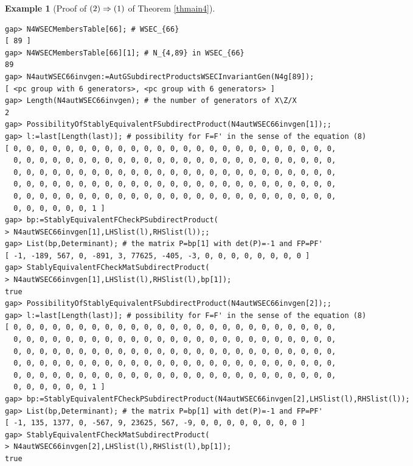 \documentclass{amsart}
\theoremstyle{plain}
\theoremstyle{definition}
\newtheorem{example}[theorem]{Example}
\theoremstyle{remark}
\begin{document}
\begin{example}[Proof of ${\rm (2)}\Rightarrow {\rm (1)}$ of {Theorem \ref{thmain4}}]
\begin{verbatim}
gap> N4WSECMembersTable[66]; # WSEC_{66}
[ 89 ]
gap> N4WSECMembersTable[66][1]; # N_{4,89} in WSEC_{66}
89
gap> N4autWSEC66invgen:=AutGSubdirectProductsWSECInvariantGen(N4g[89]);
[ <pc group with 6 generators>, <pc group with 6 generators> ]
gap> Length(N4autWSEC66invgen); # the number of generators of X\Z/X
2
gap> PossibilityOfStablyEquivalentFSubdirectProduct(N4autWSEC66invgen[1]);;
gap> l:=last[Length(last)]; # possibility for F=F' in the sense of the equation (8)
[ 0, 0, 0, 0, 0, 0, 0, 0, 0, 0, 0, 0, 0, 0, 0, 0, 0, 0, 0, 0, 0, 0, 0, 0, 0, 
  0, 0, 0, 0, 0, 0, 0, 0, 0, 0, 0, 0, 0, 0, 0, 0, 0, 0, 0, 0, 0, 0, 0, 0, 0, 
  0, 0, 0, 0, 0, 0, 0, 0, 0, 0, 0, 0, 0, 0, 0, 0, 0, 0, 0, 0, 0, 0, 0, 0, 0, 
  0, 0, 0, 0, 0, 0, 0, 0, 0, 0, 0, 0, 0, 0, 0, 0, 0, 0, 0, 0, 0, 0, 0, 0, 0, 
  0, 0, 0, 0, 0, 0, 0, 0, 0, 0, 0, 0, 0, 0, 0, 0, 0, 0, 0, 0, 0, 0, 0, 0, 0, 
  0, 0, 0, 0, 0, 0, 1 ]
gap> bp:=StablyEquivalentFCheckPSubdirectProduct(
> N4autWSEC66invgen[1],LHSlist(l),RHSlist(l));;
gap> List(bp,Determinant); # the matrix P=bp[1] with det(P)=-1 and FP=PF'
[ -1, -189, 567, 0, -891, 3, 77625, -405, -3, 0, 0, 0, 0, 0, 0, 0, 0 ]
gap> StablyEquivalentFCheckMatSubdirectProduct(
> N4autWSEC66invgen[1],LHSlist(l),RHSlist(l),bp[1]);
true
gap> PossibilityOfStablyEquivalentFSubdirectProduct(N4autWSEC66invgen[2]);;
gap> l:=last[Length(last)]; # possibility for F=F' in the sense of the equation (8)
[ 0, 0, 0, 0, 0, 0, 0, 0, 0, 0, 0, 0, 0, 0, 0, 0, 0, 0, 0, 0, 0, 0, 0, 0, 0, 
  0, 0, 0, 0, 0, 0, 0, 0, 0, 0, 0, 0, 0, 0, 0, 0, 0, 0, 0, 0, 0, 0, 0, 0, 0, 
  0, 0, 0, 0, 0, 0, 0, 0, 0, 0, 0, 0, 0, 0, 0, 0, 0, 0, 0, 0, 0, 0, 0, 0, 0, 
  0, 0, 0, 0, 0, 0, 0, 0, 0, 0, 0, 0, 0, 0, 0, 0, 0, 0, 0, 0, 0, 0, 0, 0, 0, 
  0, 0, 0, 0, 0, 0, 0, 0, 0, 0, 0, 0, 0, 0, 0, 0, 0, 0, 0, 0, 0, 0, 0, 0, 0, 
  0, 0, 0, 0, 0, 0, 1 ]
gap> bp:=StablyEquivalentFCheckPSubdirectProduct(N4autWSEC66invgen[2],LHSlist(l),RHSlist(l)); 
gap> List(bp,Determinant); # the matrix P=bp[1] with det(P)=-1 and FP=PF'
[ -1, 135, 1377, 0, -567, 9, 23625, 567, -9, 0, 0, 0, 0, 0, 0, 0, 0 ]
gap> StablyEquivalentFCheckMatSubdirectProduct(
> N4autWSEC66invgen[2],LHSlist(l),RHSlist(l),bp[1]);
true


\end{verbatim}
\end{example}
\end{document}
